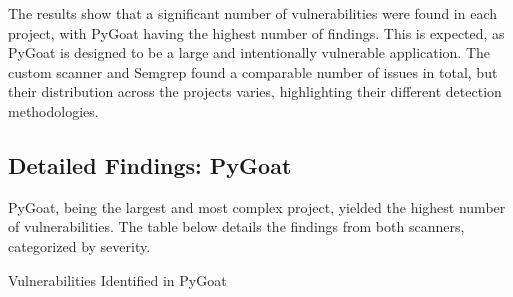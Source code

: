 The results show that a significant number of vulnerabilities were found in each project, with PyGoat having the highest number of findings. This is expected, as PyGoat is designed to be a large and intentionally vulnerable application. The custom scanner and Semgrep found a comparable number of issues in total, but their distribution across the projects varies, highlighting their different detection methodologies.

\subsection{Detailed Findings: PyGoat}

PyGoat, being the largest and most complex project, yielded the highest number of vulnerabilities. The table below details the findings from both scanners, categorized by severity.

\begin{table}[h!]
\centering
\caption{Vulnerabilities Identified in PyGoat}
\label{tab:pygoat_vulns}
\caption*{
\footnotesize *The custom scanner encountered a parsing error when analyzing PyGoat's dependencies, resulting in an incomplete component scan.
}
\end{table}

